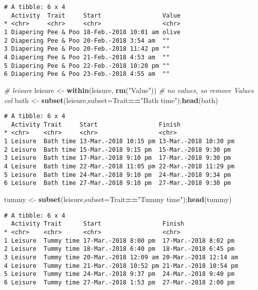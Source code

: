 \documentclass[10,portrait]{article}
\newenvironment{Shaded}{\begin{snugshade}}{\end{snugshade}}
\newcommand{\KeywordTok}[1]{\textcolor[rgb]{0.13,0.29,0.53}{\textbf{#1}}}
\newcommand{\DataTypeTok}[1]{\textcolor[rgb]{0.13,0.29,0.53}{#1}}
\newcommand{\StringTok}[1]{\textcolor[rgb]{0.31,0.60,0.02}{#1}}
\newcommand{\CommentTok}[1]{\textcolor[rgb]{0.56,0.35,0.01}{\textit{#1}}}
\newcommand{\OperatorTok}[1]{\textcolor[rgb]{0.81,0.36,0.00}{\textbf{#1}}}
\newcommand{\NormalTok}[1]{#1}
\begin{document}
\begin{verbatim}
# A tibble: 6 x 4
  Activity  Trait     Start                 Value
* <chr>     <chr>     <chr>                 <chr>
1 Diapering Pee & Poo 18-Feb.-2018 10:01 am olive
2 Diapering Pee & Poo 20-Feb.-2018 3:54 am  ""   
3 Diapering Pee & Poo 20-Feb.-2018 11:42 pm ""   
4 Diapering Pee & Poo 21-Feb.-2018 4:53 am  ""   
5 Diapering Pee & Poo 22-Feb.-2018 10:20 pm ""   
6 Diapering Pee & Poo 23-Feb.-2018 4:55 am  ""   
\end{verbatim}

\begin{Shaded}
\begin{Highlighting}[]
\CommentTok{# leisure  }
\NormalTok{leisure <-}\StringTok{ }\KeywordTok{within}\NormalTok{(leisure, }\KeywordTok{rm}\NormalTok{(}\StringTok{"Value"}\NormalTok{)) }\CommentTok{# no values, so remove Values col}
\NormalTok{bath <-}\StringTok{ }\KeywordTok{subset}\NormalTok{(leisure,}\DataTypeTok{subset=}\NormalTok{Trait}\OperatorTok{==}\StringTok{"Bath time"}\NormalTok{);}\KeywordTok{head}\NormalTok{(bath)}
\end{Highlighting}
\end{Shaded}

\begin{verbatim}
# A tibble: 6 x 4
  Activity Trait     Start                 Finish               
* <chr>    <chr>     <chr>                 <chr>                
1 Leisure  Bath time 13-Mar.-2018 10:15 pm 13-Mar.-2018 10:30 pm
2 Leisure  Bath time 15-Mar.-2018 9:15 pm  15-Mar.-2018 9:30 pm 
3 Leisure  Bath time 17-Mar.-2018 9:10 pm  17-Mar.-2018 9:30 pm 
4 Leisure  Bath time 22-Mar.-2018 11:05 pm 22-Mar.-2018 11:29 pm
5 Leisure  Bath time 24-Mar.-2018 9:10 pm  24-Mar.-2018 9:34 pm 
6 Leisure  Bath time 27-Mar.-2018 9:10 pm  27-Mar.-2018 9:30 pm 
\end{verbatim}

\begin{Shaded}
\begin{Highlighting}[]
\NormalTok{tummy <-}\StringTok{ }\KeywordTok{subset}\NormalTok{(leisure,}\DataTypeTok{subset=}\NormalTok{Trait}\OperatorTok{==}\StringTok{"Tummy time"}\NormalTok{);}\KeywordTok{head}\NormalTok{(tummy)}
\end{Highlighting}
\end{Shaded}

\begin{verbatim}
# A tibble: 6 x 4
  Activity Trait      Start                 Finish               
* <chr>    <chr>      <chr>                 <chr>                
1 Leisure  Tummy time 17-Mar.-2018 8:00 pm  17-Mar.-2018 8:02 pm 
2 Leisure  Tummy time 18-Mar.-2018 6:40 pm  18-Mar.-2018 6:45 pm 
3 Leisure  Tummy time 20-Mar.-2018 12:09 am 20-Mar.-2018 12:14 am
4 Leisure  Tummy time 21-Mar.-2018 10:52 pm 21-Mar.-2018 10:54 pm
5 Leisure  Tummy time 24-Mar.-2018 9:37 pm  24-Mar.-2018 9:40 pm 
6 Leisure  Tummy time 27-Mar.-2018 1:53 pm  27-Mar.-2018 2:00 pm 
\end{verbatim}
\end{document}

